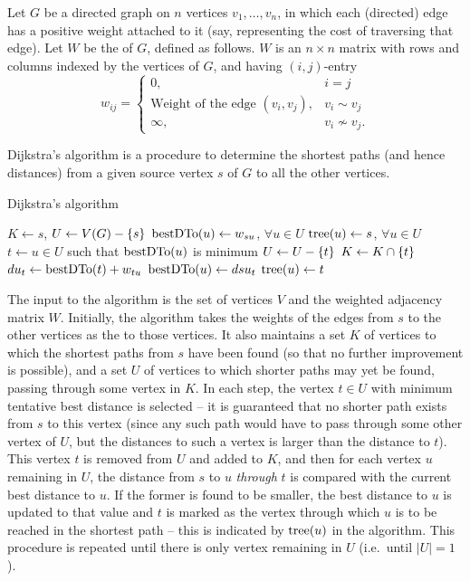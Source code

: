 Let $G$ be a directed graph on $n$ vertices $v_1, \ldots, v_n$, in which each (directed) edge has a positive weight attached to it (say, representing the cost of traversing that edge). Let $W$ be the  of $G$, defined as follows. $W$ is an $n \times n$ matrix with rows and columns indexed by the vertices of $G$, and having $(i,j)$-entry
\begin{equation*}
w_{ij} = \begin{cases}
0, & i = j\\
\text{Weight of the edge $(v_i, v_j)$}, & v_i \sim v_j\\
\infty, & v_i \not\sim v_j.
\end{cases}
\end{equation*}

Dijkstra's algorithm is a procedure to determine the shortest paths (and hence distances) from a given source vertex $s$ of $G$ to all the other vertices. 

\begin{algorithm}\caption{Dijkstra's algorithm}\label{alg:Dijkstra}
\begin{algorithmic}[1]
	\State $K \gets {s}$, $U \gets V(G) - \qty{s}$
	\State $\operatorname{bestDTo}(u) \gets w_{su}$, $\forall u \in U$
	\State $\operatorname{tree}(u) \gets s$, $\forall u \in U$
		\State $t \gets u \in U$ such that $\operatorname{bestDTo}(u)$ is minimum
		\State $U \gets U - \qty{t}$ 
		\State $K \gets K \cap \qty{t}$ 
			\State $du_t \gets \operatorname{bestDTo}(t) + w_{tu}$ 
				\State $\operatorname{bestDTo}(u) \gets dsu_t$
				\State $\operatorname{tree}(u) \gets t$
			\EndIf
		\EndFor
	\EndWhile
\end{algorithmic}
\end{algorithm}


The input to the algorithm is the set of vertices $V$ and the weighted adjacency matrix $W$. Initially, the algorithm takes the weights of the edges from $s$ to the other vertices as the  to those vertices. It also maintains a set $K$ of vertices to which the shortest paths from $s$ have been found (so that no further improvement is possible), and a set $U$ of vertices to which shorter paths may yet be found, passing through some vertex in $K$. In each step, the vertex $t \in U$ with minimum tentative best distance is selected -- it is guaranteed that no shorter path exists from $s$ to this vertex (since any such path would have to pass through some other vertex of $U$, but the distances to such a vertex is larger than the distance to $t$). This vertex $t$ is removed from $U$ and added to $K$, and then for each vertex $u$ remaining in $U$, the distance from $s$ to $u$ \emph{through} $t$ is compared with the current best distance to $u$. If the former is found to be smaller, the best distance to $u$ is updated to that value and $t$ is marked as the vertex through which $u$ is to be reached in the shortest path -- this is indicated by $\operatorname{tree}(u)$ in the algorithm. This procedure is repeated until there is only vertex remaining in $U$ (i.e.\ until $|U| = 1$).


